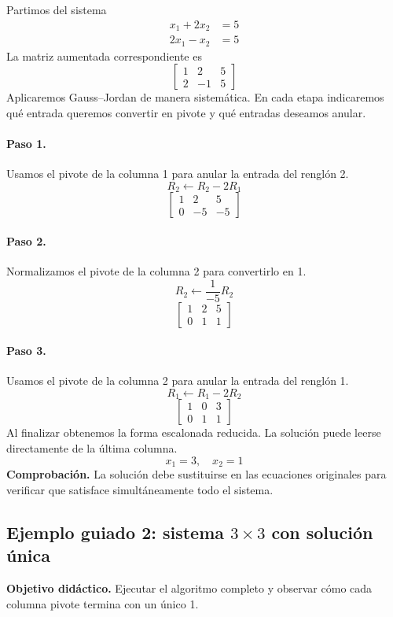 \documentclass[12pt]{article}
\theoremstyle{remark}
\begin{document}
Partimos del sistema
\[
\begin{aligned}
x_{1} + 2 x_{2} &= 5\\
2 x_{1} - x_{2} &= 5
\end{aligned}
\]
La matriz aumentada correspondiente es
\[
\left[\begin{array}{cc|c}
1 & 2 & 5\\
2 & -1 & 5
\end{array}\right]
\]
Aplicaremos Gauss--Jordan de manera sistemática. En cada etapa indicaremos qué entrada queremos convertir en pivote y qué entradas deseamos anular.
\paragraph{Paso 1.} Usamos el pivote de la columna 1 para anular la entrada del renglón 2.
\[
R_{2}\leftarrow R_{2}-2R_{1}
\]
\[
\left[\begin{array}{cc|c}
1 & 2 & 5\\
0 & -5 & -5
\end{array}\right]
\]
\paragraph{Paso 2.} Normalizamos el pivote de la columna 2 para convertirlo en 1.
\[
R_{2}\leftarrow \frac{1}{-5}R_{2}
\]
\[
\left[\begin{array}{cc|c}
1 & 2 & 5\\
0 & 1 & 1
\end{array}\right]
\]
\paragraph{Paso 3.} Usamos el pivote de la columna 2 para anular la entrada del renglón 1.
\[
R_{1}\leftarrow R_{1}-2R_{2}
\]
\[
\left[\begin{array}{cc|c}
1 & 0 & 3\\
0 & 1 & 1
\end{array}\right]
\]
Al finalizar obtenemos la forma escalonada reducida. La solución puede leerse directamente de la última columna.
\[
\boxed{x_{1}=3,\quad x_{2}=1}
\]
\textbf{Comprobación.} La solución debe sustituirse en las ecuaciones originales para verificar que satisface simultáneamente todo el sistema.

\subsection*{Ejemplo guiado 2: sistema $3\times3$ con solución única}
\textbf{Objetivo didáctico.} Ejecutar el algoritmo completo y observar cómo cada columna pivote termina con un único 1.
\end{document}
